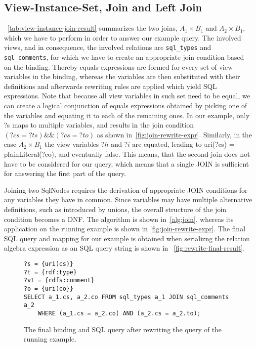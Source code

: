 \documentclass[a4paper,twoside,bibtotoc,abstracton,12pt,BCOR=15mm]{scrreprt}
\begin{document}
\subsection{View-Instance-Set, Join and Left Join}
~\autoref{tab:view-instance-join-result} summarizes the two joins, $A_1 \times B_1$ and $A_2 \times B_1$, which we have to perform in order to answer our example query.
The involved views, and in consequence, the involved relations are \texttt{sql\_types} and \texttt{sql\_comments}, for which we have to create an appropriate join condition
based on the binding.
Thereby equals-expressions are formed for every set of view variables in the binding, whereas the variables are then substituted with their definitions and afterwards rewriting rules are
applied which yield SQL expressions.
Note that because all view variables in such set need to be equal,
we can create a logical conjunction of equals expressions obtained by
picking one of the variables and equating it to each of the remaining ones.
In our example, only ?s maps to multiple variables, and results in the join condition $(?cs = ?ts) \&\& (?cs = ?to)$ as shown in~\autoref{fig:join-rewrite-expr}. 
Similarly, in the case $A_2 \times B_1$ the view variables $?h$ and $?i$ are equated, leading to uri(?cs) = plainLiteral(?co), and eventually false.
This means, that the second join does not have to be considered for our query, which means that a single JOIN is sufficient for answering the
first part of the query.



Joining two SqlNodes requires the derivation of appropriate JOIN conditions for any variables they have in common.
Since variables may have multiple alternative definitions, such as introduced by unions, the overall structure of
the join condition becomes a DNF. The algorithm is shown in~\autoref{alg:join}, whereas its application on the
running example is shown in \autoref{fig:join-rewrite-expr}.
The final SQL query and mapping for our example is obtained when serializng the relation algebra expression as an SQL query string is shown in ~\autoref{fig:rewrite-final-result}.

\begin{figure}[!h]
\begin{scriptsize}
\begin{lstlisting}
?s = {uri(cs)}
?t = {rdf:type}
?v1 = {rdfs:comment} 
?o = {uri(co}}
SELECT a_1.cs, a_2.co FROM sql_types a_1 JOIN sql_comments a_2
    WHERE (a_1.cs = a_2.co) AND (a_2.cs = a_2.to);
\end{lstlisting}
\end{scriptsize}
\caption{The final binding and SQL query after rewriting the query of the running example.}
\label{fig:rewrite-final-result}
\end{figure}
\end{document}
